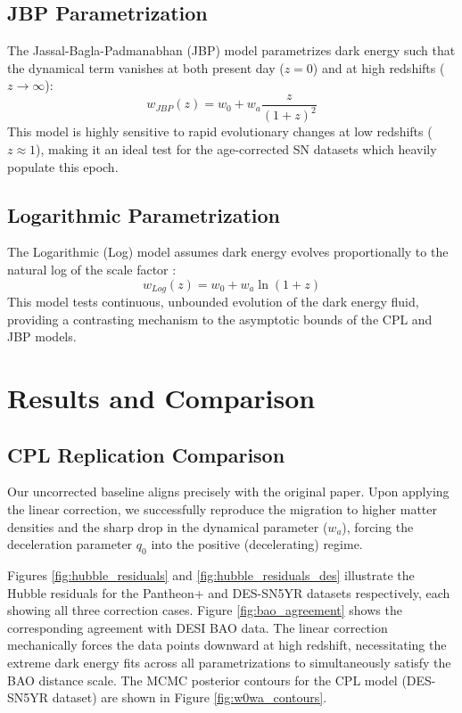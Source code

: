 \documentclass[12pt, a4paper]{article}
\begin{document}
\subsection{JBP Parametrization}
The Jassal-Bagla-Padmanabhan (JBP) model \citep{jassal2005} parametrizes dark energy such that the dynamical term vanishes at both present day ($z=0$) and at high redshifts ($z \to \infty$):
\begin{equation}
    w_{JBP}(z) = w_0 + w_a \frac{z}{(1+z)^2}
\end{equation}
This model is highly sensitive to rapid evolutionary changes at low redshifts ($z \approx 1$), making it an ideal test for the age-corrected SN datasets which heavily populate this epoch.

\subsection{Logarithmic Parametrization}
The Logarithmic (Log) model assumes dark energy evolves proportionally to the natural log of the scale factor \citep{efstathiou1999}:
\begin{equation}
    w_{Log}(z) = w_0 + w_a \ln(1+z)
\end{equation}
This model tests continuous, unbounded evolution of the dark energy fluid, providing a contrasting mechanism to the asymptotic bounds of the CPL and JBP models.

\section{Results and Comparison}

\subsection{CPL Replication Comparison}
Our uncorrected baseline aligns precisely with the original paper. Upon applying the linear correction, we successfully reproduce the migration to higher matter densities and the sharp drop in the dynamical parameter ($w_a$), forcing the deceleration parameter $q_0$ into the positive (decelerating) regime.

Figures \ref{fig:hubble_residuals} and \ref{fig:hubble_residuals_des} illustrate the Hubble residuals for the Pantheon+ and DES-SN5YR datasets respectively, each showing all three correction cases. Figure \ref{fig:bao_agreement} shows the corresponding agreement with DESI BAO data. The linear correction mechanically forces the data points downward at high redshift, necessitating the extreme dark energy fits across all parametrizations to simultaneously satisfy the BAO distance scale. The MCMC posterior contours for the CPL model (DES-SN5YR dataset) are shown in Figure \ref{fig:w0wa_contours}.
\end{document}
